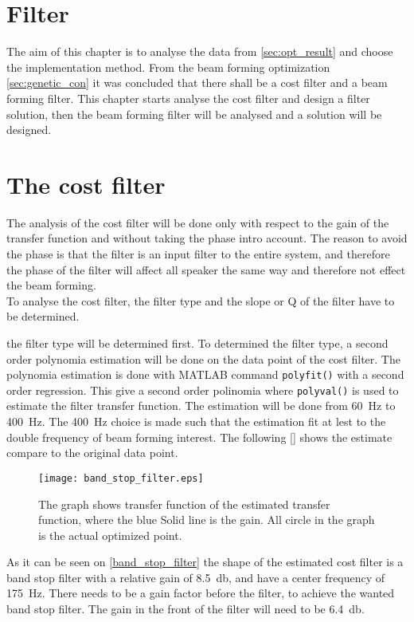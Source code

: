 \section{Filter}\label{sec:filter_design}

The aim of this chapter is to analyse the data from \ref{sec:opt_result} and choose the implementation method. From the beam forming optimization \autoref{sec:genetic_con} it was concluded that there shall be a cost filter and a beam forming filter. This chapter starts analyse the cost filter and design a filter solution, then the beam forming filter will be analysed and a solution will be designed.


\section{The cost filter}
The analysis of the cost filter will be done only with respect to the gain of the transfer function and without taking the phase intro account. The reason to avoid the phase is that the filter is an input filter to the entire system, and therefore the phase of the filter will affect all speaker the same way and therefore not effect the beam forming. \\
To analyse the cost filter, the filter type and the slope or Q of the filter have to be determined. 

the filter type will be determined first. To determined the filter type, a second order polynomia estimation will be done on the data point of the cost filter. The polynomia estimation is done with MATLAB command \texttt{polyfit()} with a second order regression. This give a second order polinomia where  \texttt{polyval()} is used to estimate the filter transfer function. The estimation will be done from \SI{60}{\hertz} to \SI{400}{\hertz}. The \SI{400}{\hertz} choice is made such that the estimation fit at lest to the double frequency of beam forming interest. The following \autoref{} shows the estimate compare to the original data point.

\begin{figure}[H]
	\centering
	\texttt{[image: band\_stop\_filter.eps]}
	\caption{The graph shows transfer function of the estimated transfer function, where the blue  Solid line is the gain. All circle in the graph is the actual optimized point.}
		\label{fig:band_stop_filter}
\end{figure}


As it can be seen on \autoref{band_stop_filter} the shape of the estimated cost filter is a band stop filter with a relative gain of \SI{8.5}{\decibel}, and have a center frequency of \SI{175}{\hertz}. There needs to be a gain factor before the filter, to achieve the wanted band stop filter. The gain in the front of the filter will need to be \SI{6.4}{\decibel}. \\

